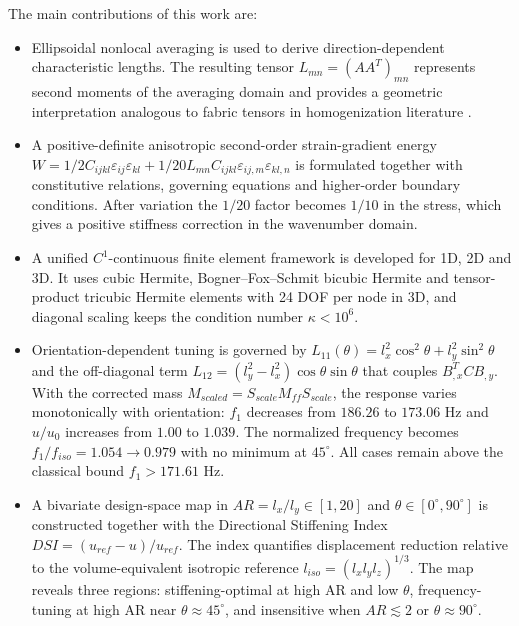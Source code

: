 \documentclass[final,3p,times,fleqn]{elsarticle}
\newcommand{\rev}[1]{\textcolor{revcolor}{#1}}
\begin{document}
The main contributions of this work are:
\begin{itemize}
    \item \rev{Ellipsoidal nonlocal averaging is used to derive direction-dependent characteristic lengths. The resulting tensor $L_{mn}=(AA^T)_{mn}$ represents second moments of the averaging domain and provides a geometric interpretation analogous to fabric tensors in homogenization literature \cite{LazarPo2015,Polizzotto2018,Auffray2019}.}
    \item \rev{A positive-definite anisotropic second-order strain-gradient energy $W=1/2 C_{ijkl}\varepsilon_{ij}\varepsilon_{kl}+1/20 L_{mn}C_{ijkl}\varepsilon_{ij,m}\varepsilon_{kl,n}$ is formulated together with constitutive relations, governing equations and higher-order boundary conditions. After variation the $1/20$ factor becomes $1/10$ in the stress, which gives a positive stiffness correction in the wavenumber domain.}
    \item \rev{A unified $C^{1}$-continuous finite element framework is developed for 1D, 2D and 3D. It uses cubic Hermite, Bogner--Fox--Schmit bicubic Hermite and tensor-product tricubic Hermite elements with 24 DOF per node in 3D, and diagonal scaling keeps the condition number $\kappa<10^6$.}
    \item \rev{Orientation-dependent tuning is governed by $L_{11}(\theta)=l_x^2\cos^2\theta+l_y^2\sin^2\theta$ and the off-diagonal term $L_{12}=(l_y^2-l_x^2)\cos\theta\sin\theta$ that couples $B_{,x}^T C B_{,y}$. With the corrected mass $M_{scaled}=S_{scale}M_{ff}S_{scale}$, the response varies monotonically with orientation: $f_1$ decreases from $186.26$ to $173.06$ Hz and $u/u_0$ increases from $1.00$ to $1.039$. The normalized frequency becomes $f_1/f_{iso}=1.054\to0.979$ with no minimum at $45^\circ$. All cases remain above the classical bound $f_1>171.61$ Hz.}
    \item \rev{A bivariate design-space map in $AR=l_x/l_y\in[1,20]$ and $\theta\in[0^\circ,90^\circ]$ is constructed together with the Directional Stiffening Index $DSI=(u_{ref}-u)/u_{ref}$. The index quantifies displacement reduction relative to the volume-equivalent isotropic reference $l_{iso}=(l_xl_yl_z)^{1/3}$. The map reveals three regions: stiffening-optimal at high AR and low $\theta$, frequency-tuning at high AR near $\theta\approx45^\circ$, and insensitive when $AR\lesssim2$ or $\theta\approx90^\circ$.}
\end{itemize}
\end{document}

